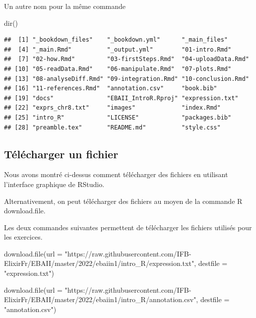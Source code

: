 \documentclass[
]{book}
\newenvironment{Shaded}{\begin{snugshade}}{\end{snugshade}}
\newcommand{\AttributeTok}[1]{\textcolor[rgb]{0.77,0.63,0.00}{#1}}
\newcommand{\FunctionTok}[1]{\textcolor[rgb]{0.00,0.00,0.00}{#1}}
\newcommand{\NormalTok}[1]{#1}
\newcommand{\StringTok}[1]{\textcolor[rgb]{0.31,0.60,0.02}{#1}}
\begin{document}
Un autre nom pour la même commande

\begin{Shaded}
\begin{Highlighting}[]
\FunctionTok{dir}\NormalTok{()}
\end{Highlighting}
\end{Shaded}

\begin{verbatim}
##  [1] "_bookdown_files"    "_bookdown.yml"      "_main_files"       
##  [4] "_main.Rmd"          "_output.yml"        "01-intro.Rmd"      
##  [7] "02-how.Rmd"         "03-firstSteps.Rmd"  "04-uploadData.Rmd" 
## [10] "05-readData.Rmd"    "06-manipulate.Rmd"  "07-plots.Rmd"      
## [13] "08-analyseDiff.Rmd" "09-integration.Rmd" "10-conclusion.Rmd" 
## [16] "11-references.Rmd"  "annotation.csv"     "book.bib"          
## [19] "docs"               "EBAII_IntroR.Rproj" "expression.txt"    
## [22] "exprs_chr8.txt"     "images"             "index.Rmd"         
## [25] "intro_R"            "LICENSE"            "packages.bib"      
## [28] "preamble.tex"       "README.md"          "style.css"
\end{verbatim}

\hypertarget{tuxe9luxe9charger-un-fichier}{%
\subsection{Télécharger un fichier}\label{tuxe9luxe9charger-un-fichier}}

Nous avons montré ci-dessus comment télécharger des fichiers en utilisant l'interface graphique de RStudio.

Alternativement, on peut télécharger des fichiers au moyen de la commande R download.file.

Les deux commandes suivantes permettent de télécharger les fichiers utilisés pour les exercices.

\begin{Shaded}
\begin{Highlighting}[]
\FunctionTok{download.file}\NormalTok{(}\AttributeTok{url =} \StringTok{"https://raw.githubusercontent.com/IFB{-}ElixirFr/EBAII/master/2022/ebaiin1/intro\_R/expression.txt"}\NormalTok{, }\AttributeTok{destfile =} \StringTok{"expression.txt"}\NormalTok{)}
\end{Highlighting}
\end{Shaded}

\begin{Shaded}
\begin{Highlighting}[]
\FunctionTok{download.file}\NormalTok{(}\AttributeTok{url =} \StringTok{"https://raw.githubusercontent.com/IFB{-}ElixirFr/EBAII/master/2022/ebaiin1/intro\_R/annotation.csv"}\NormalTok{, }\AttributeTok{destfile =} \StringTok{"annotation.csv"}\NormalTok{)}
\end{Highlighting}
\end{Shaded}
\end{document}
